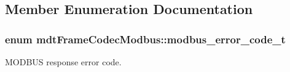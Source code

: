 \subsection{Member Enumeration Documentation}
\hypertarget{classmdt_frame_codec_modbus_a31d8291be7f8636d5d295ce3066d7ac7}{
\subsubsection[{modbus\_\-error\_\-code\_\-t}]{\setlength{\rightskip}{0pt plus 5cm}enum {\bf mdtFrameCodecModbus::modbus\_\-error\_\-code\_\-t}}}
\label{classmdt_frame_codec_modbus_a31d8291be7f8636d5d295ce3066d7ac7}


MODBUS response error code. 


